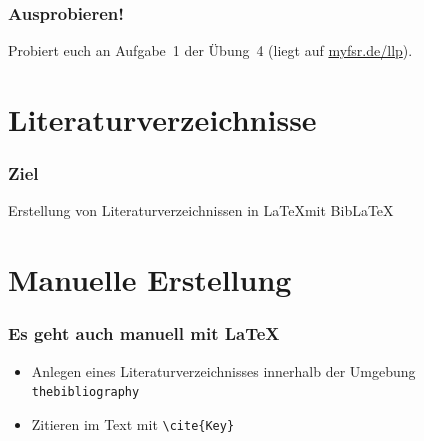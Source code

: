 \begin{frame}
  \frametitle{Ausprobieren!}
  \begin{center}
    Probiert euch an Aufgabe~1 der Übung~4 (liegt auf \url{myfsr.de/llp}).
  \end{center}
\end{frame}

\section{Literaturverzeichnisse}

\begin{frame}
  \frametitle{Ziel}

  \begin{center}
  Erstellung von Literaturverzeichnissen in \LaTeX mit Bib\LaTeX
  \end{center}

\end{frame}

\section{Manuelle Erstellung}

\begin{frame}[fragile]
  \frametitle{Es geht auch manuell mit \LaTeX}

  \begin{itemize}
    \item<+-> Anlegen eines Literaturverzeichnisses innerhalb der Umgebung \lstinline!thebibliography!
    \item<+-> Zitieren im Text mit \lstinline!\cite{Key}!
  \end{itemize}
\end{frame}

